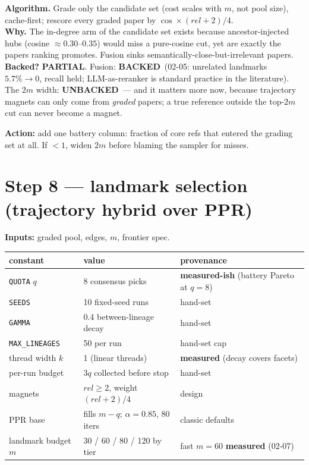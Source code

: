 \documentclass[10pt]{article}
\newenvironment{varbox}
  {\par\medskip\begin{lrbox}{\varboxsave}%
   \begin{minipage}{\dimexpr\linewidth-2\fboxsep\relax}\small\vspace{4pt}}
  {\vspace{4pt}\end{minipage}\end{lrbox}%
   \noindent\colorbox{boxbg}{\usebox{\varboxsave}}\par\medskip}
\newcommand{\backedyes}{\textcolor{green!50!black}{\textbf{BACKED}}}
\newcommand{\backedpart}{\textcolor{orange!80!black}{\textbf{PARTIAL}}}
\newcommand{\backedno}{\textcolor{red!70!black}{\textbf{UNBACKED}}}
\newcommand{\act}[1]{\par\smallskip\noindent\textbf{Action:} #1}
\begin{document}
\textbf{Algorithm.} Grade only the candidate set (cost scales with $m$, not pool size),
cache-first; rescore every graded paper by $\cos \times (rel+2)/4$. \\
\textbf{Why.} The in-degree arm of the candidate set exists because ancestor-injected hubs
(cosine ${\approx}0.30$--$0.35$) would miss a pure-cosine cut, yet are exactly the papers
ranking promotes. Fusion sinks semantically-close-but-irrelevant papers. \\
\textbf{Backed?} \backedpart. Fusion: \backedyes\ (02-05: unrelated landmarks
$5.7\% \to 0$, recall held; LLM-as-reranker is standard practice in the literature). The
$2m$ width: \backedno\ --- and it matters more now, because trajectory magnets can only
come from \emph{graded} papers; a true reference outside the top-$2m$ cut can never become
a magnet. \\
\act{add one battery column: fraction of core refs that entered the grading set at all. If
$<1$, widen $2m$ before blaming the sampler for misses.}

\section{Step 8 --- landmark selection (trajectory hybrid over PPR)}
\textbf{Inputs:} graded pool, edges, $m$, frontier spec.

\begin{varbox}
\begin{tabular}{@{}lll@{}}
\toprule
constant & value & provenance \\
\midrule
\texttt{QUOTA} $q$ & 8 consensus picks & \textbf{measured-ish} (battery Pareto at $q{=}8$) \\
\texttt{SEEDS} & 10 fixed-seed runs & hand-set \\
\texttt{GAMMA} & 0.4 between-lineage decay & hand-set \\
\texttt{MAX\_LINEAGES} & 50 per run & hand-set cap \\
thread width $k$ & 1 (linear threads) & \textbf{measured} (decay covers facets) \\
per-run budget & $3q$ collected before stop & hand-set \\
magnets & $rel \geq 2$, weight $(rel+2)/4$ & design \\
PPR base & fills $m-q$; $\alpha{=}0.85$, 80 iters & classic defaults \\
landmark budget $m$ & 30 / 60 / 80 / 120 by tier & fast $m{=}60$ \textbf{measured} (02-07) \\
\bottomrule
\end{tabular}
\end{varbox}
\end{document}
